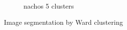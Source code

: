 \documentclass{article}
\begin{document}
\begin{figure}
\begin{subfigure}[b]{0.3\textwidth}
                    \caption{nachos 5 clusters}
                    \label{fig:nachos5}
            \end{subfigure}
            \caption{Image segmentation by Ward clustering}\label{fig:images3}
    \end{figure}
\end{document}
